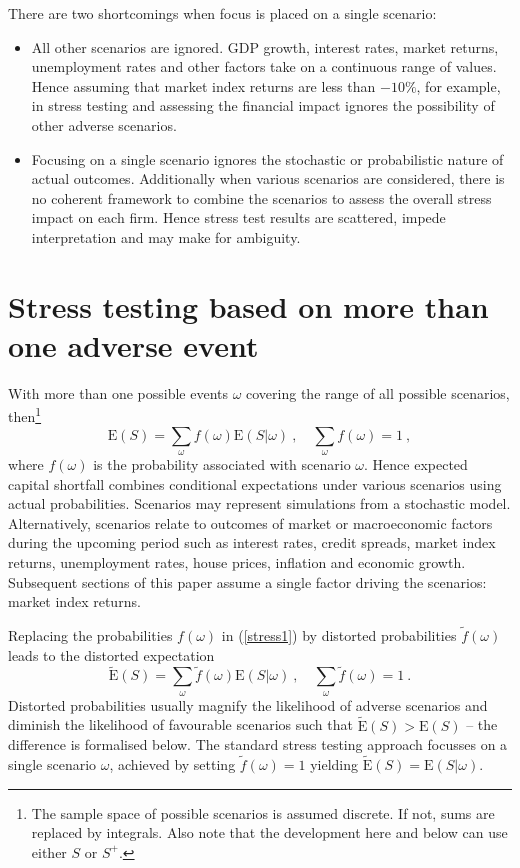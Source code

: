 \documentclass[authoryear]{elsarticle}
\newcommand{\E}{{\mathrm E}}
\newcommand{\cq}{\ ,\quad }
\newcommand{\eref}[1]{(\ref{#1})}
\newcommand{\bi}{\begin{itemize}}
\renewcommand{\i}{\item}
\newcommand{\ei}{\end{itemize}}
\begin{document}
There are two shortcomings when focus is placed on a single scenario:
\bi
\i All other scenarios are ignored. GDP growth, interest rates, market  returns, unemployment rates and other factors take on a continuous range of values. Hence assuming that market index returns are less than $-10\%$, for example, in stress testing and assessing the financial impact ignores the possibility of other adverse scenarios.

\i Focusing on a single scenario ignores the stochastic or probabilistic nature of actual outcomes. Additionally  when various scenarios are considered, there is no coherent framework to combine the scenarios to assess the overall stress impact on each firm. Hence stress test results are scattered, impede interpretation and may make for ambiguity.
\ei

\section{Stress testing based on more than one adverse event}\label{s_extend}

With more than one possible events $\omega$ covering the range of all possible scenarios, then\footnote{The sample space of possible scenarios is assumed discrete.   If not,  sums are replaced by integrals.  Also note that the development here and below can use either $S$ or $S^+$.} 
\begin{equation}\label{stress1}
\E(S) =  \sum_\omega f(\omega) \E(S|\omega)\cq \sum_\omega f(\omega)=1\ ,
\end{equation}
where $f(\omega)$ is the probability associated with scenario $\omega$.  
Hence expected capital shortfall combines conditional expectations under various scenarios using actual probabilities. Scenarios may represent simulations from a stochastic model.   Alternatively, scenarios relate to outcomes of market or macroeconomic factors during the upcoming period such as interest rates, credit spreads, market index returns, unemployment rates, house prices, inflation and economic growth. Subsequent sections of this paper assume a single factor driving the scenarios: market index returns.

Replacing the probabilities $f(\omega)$  in \eref{stress1} by distorted probabilities $\tilde f(\omega)$ leads to the distorted expectation
\begin{equation}\label{stress2}
\widetilde \E(S) =  \sum_\omega \tilde f(\omega) \E(S|\omega)\cq \sum_\omega \tilde f(\omega)=1\ .
\end{equation}
 Distorted  probabilities usually magnify the likelihood of adverse scenarios and diminish the likelihood of favourable scenarios such that  $\widetilde \E(S)>\E(S)$ -- the difference is formalised below. The standard stress testing approach focusses on a single scenario $\omega$, achieved by setting $\tilde f(\omega) =1$ yielding $\widetilde\E(S)=\E(S|\omega)$.
\end{document}
